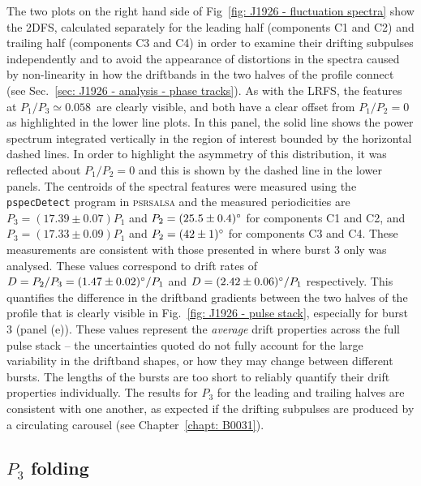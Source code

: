The two plots on the right hand side of Fig~\ref{fig: J1926 - fluctuation spectra} show the 2DFS, calculated separately for the leading half (components C1 and C2) and trailing half (components C3 and C4) in order to examine their drifting subpulses independently and to avoid the appearance of distortions in the spectra caused by non-linearity in how the driftbands in the two halves of the profile connect (see Sec.~\ref{sec: J1926 - analysis - phase tracks}). As with the LRFS, the features at $P_1/P_3 \simeq 0.058$~are clearly visible, and both have a clear offset from $P_1/P_2 = 0$ as highlighted in the lower line plots. In this panel, the solid line shows the power spectrum integrated vertically in the region of interest bounded by the horizontal dashed lines. In order to highlight the asymmetry of this distribution, it was reflected about $P_1/P_2 = 0$ and this is shown by the dashed line in the lower panels. The centroids of the spectral features were measured using the \texttt{pspecDetect} program in \textsc{psrsalsa} and the measured periodicities are $P_3 = (17.39 \pm 0.07)P_1$ and $P_2 = (25.5 \pm 0.4)^\circ$ for components C1 and C2, and $P_3 = (17.33 \pm 0.09)P_1$ and $P_2 = (42\pm 1)^\circ$ for components C3 and C4. These measurements are consistent with those presented in \citet{ZLH+2019} where burst 3 only was analysed. These values correspond to drift rates of $D = P_2 / P_3 = (1.47 \pm 0.02)^\circ/P_1$ and $D = (2.42 \pm 0.06)^\circ/P_1$ respectively. This quantifies the difference in the driftband gradients between the two halves of the profile that is clearly visible in Fig.~\ref{fig: J1926 - pulse stack}, especially for burst 3 (panel (e)). These values represent the \textit{average} drift properties across the full pulse stack -- the uncertainties quoted do not fully account for the large variability in the driftband shapes, or how they may change between different bursts. The lengths of the bursts are too short to reliably quantify their drift properties individually. The results for $P_3$ for the leading and trailing halves are consistent with one another, as expected if the drifting subpulses are produced by a circulating carousel (see Chapter~\ref{chapt: B0031}).




\subsection{\texorpdfstring{$P_3$}{P3} folding}
\label{sec: J1926 - analysis - P3 folding}

